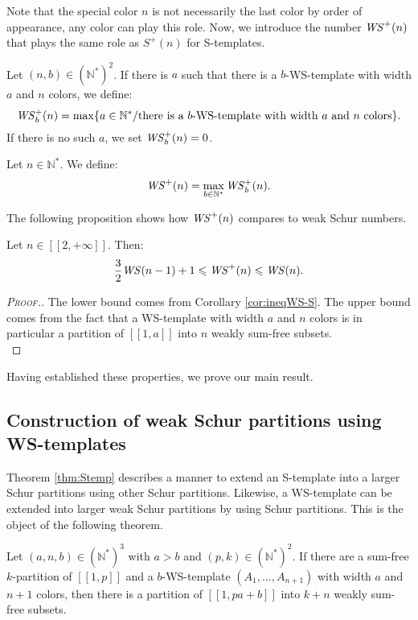 Note that the special color \(n\) is not necessarily the last color by order of appearance, any color can play this role.
Now, we introduce the number \(\mathit{WS}^+(n)\) that plays the same role as \(S^+(n)\) for S-templates. 

\begin{definition}
Let \( (n,b) \in (\mathbb{N}^*)^2\). If there is \(a\) such that there is a \(b\)-WS-template with width \(a\)
and \(n\) colors, we define:
\[
\mathit{WS}_b^+(n)= \max \{a \in \mathbb{N}^*/ \text{there is a } b \text{-WS-template with width } a \text{ and } n \text{ colors} \}.
\]
If there is no such \(a\), we set \(\mathit{WS}_b^+(n) = 0\).
\end{definition}

\begin{definition}
Let \( n \in \mathbb{N}^*\). We define:
\[
\mathit{WS}^+(n)=\max_{b\in \mathbb{N}^*} \mathit{WS}_b^+(n).
\]
\end{definition}
The following proposition shows how \(\mathit{WS}^+(n)\) compares to weak Schur numbers.
\begin{proposition}
Let \(n \in [\![2, +\infty]\!]\). Then:
\[
\frac{3}{2} \mathit{WS} (n-1)+1 \leqslant \mathit{WS}^+(n) \leqslant \mathit{WS} (n).
\]
\end{proposition}

\begin{proof}[\textsc{Proof.}]
The lower bound comes from Corollary \ref{cor:ineqWS-S}.
The upper bound comes from the fact that a WS-template with width \(a\) and \(n\) colors is in particular a partition of
\([\![1, a]\!]\) into \(n\) weakly sum-free subsets. \\
\end{proof}

Having established these properties, we prove our main result.

\subsection{Construction of weak Schur partitions using WS-templates}
\label{ConstructionWS}

Theorem \ref{thm:Stemp} describes a manner to extend an S-template into a larger Schur partitions using other Schur 
partitions. Likewise, a WS-template can be extended into larger weak Schur partitions by using Schur partitions. This 
is the object of the following theorem.

\begin{theorem}
\label{thm:WStemp}
Let \((a,n,b) \in (\mathbb{N}^*)^3\) with \(a > b\) and \( (p,k) \in (\mathbb{N}^*)^2\). If there are a sum-free \(k\)-partition of
\([\![1,p]\!]\) and a \(b\)-WS-template \((A_1,...,A_{n+1})\) with width \(a\) and \(n+1\) colors,
then there is a partition of \([\![1, p a + b]\!]\) into \(k+n\) weakly sum-free subsets.
\end{theorem}

